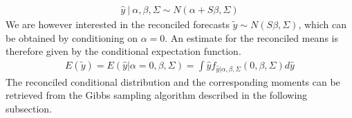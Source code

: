 \documentclass[a4paper,fleqn,11pt]{article}
\begin{document}
\begin{align}
\hat{y}\ |\ \alpha,\beta,\Sigma \sim N(\alpha + S\beta,\Sigma)
\end{align}
We are however interested in the reconciled forecasts $\tilde{y} \sim N(S\beta,\Sigma)$, which can be obtained by conditioning on $\alpha = 0$. An estimate for the reconciled means is therefore given by the conditional expectation function.
\begin{align}
	E(\tilde{y}) = E(\hat{y}|\alpha = 0,\beta,\Sigma) = \int \hat{y} f_{\hat{y}|\alpha,\beta,\Sigma}(0,\beta,\Sigma) d\hat{y} 
\end{align}
The reconciled conditional distribution and the corresponding moments can be retrieved from the Gibbs sampling algorithm described in the following subsection.\\

\clearpage
\end{document}
